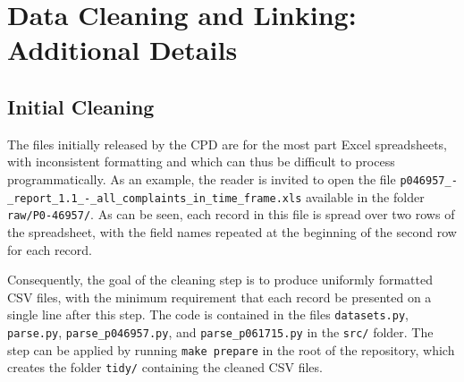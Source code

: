 \section{Data Cleaning and Linking: Additional Details}\label{sec:app-cleaning}

\subsection{Initial Cleaning}

The files initially released by the CPD are for
the most part Excel spreadsheets, with inconsistent formatting and which can
thus be difficult to process programmatically. As an example, the reader is
invited to open the file
\texttt{p046957\_-\_report\_1.1\_-\_all\_complaints\_in\_time\_frame.xls}
available in the folder \texttt{raw/P0-46957/}. As can be seen, each record in
this file is spread over two rows of the spreadsheet, with the field names
repeated at the beginning of the second row for each record.

Consequently, the goal of the cleaning step is to produce uniformly formatted
CSV files, with the minimum requirement that each record be presented on
a single line after this step. The code is contained in the files
\texttt{datasets.py}, \texttt{parse.py}, \texttt{parse\_p046957.py}, and \texttt{parse\_p061715.py} in the
\texttt{src/} folder.  The step can be applied by running \texttt{make prepare}
in the root of the repository, which creates the folder \texttt{tidy/}
containing the cleaned CSV files.

